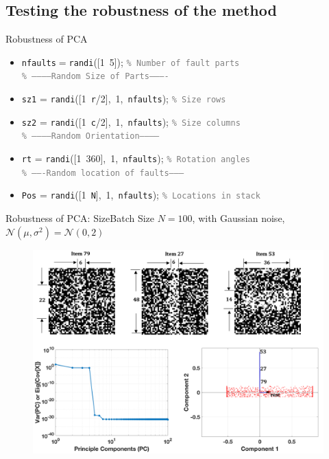 \documentclass{beamer}
\begin{document}
\subsection{Testing the robustness of the method}

\begin{frame}{Robustness of PCA}
  \begin{itemize}
    \item \texttt{nfaults}$ = $\texttt{randi}([1~5]); \texttt{\textcolor{gray}{\% Number of fault parts}} \\
    \texttt{\textcolor{gray}{\% -----------Random Size of Parts----------}}
    \item \texttt{sz1} = \texttt{randi}([1~\texttt{r}/2],~1,~\texttt{nfaults}); \texttt{\textcolor{gray}{\% Size rows}}
    \item \texttt{sz2} = \texttt{randi}([1~\texttt{c}/2],~1,~\texttt{nfaults}); \texttt{\textcolor{gray}{\% Size columns}}\\
    \texttt{\textcolor{gray}{\% -----------Random Orientation------------}}
    \item \texttt{rt} = \texttt{randi}([1~360],~1,~\texttt{nfaults}); \texttt{\textcolor{gray}{\% Rotation angles}} \\
    \texttt{\textcolor{gray}{\% -------Random location of faults---------}}
    \item \texttt{Pos} = \texttt{randi}([1~\texttt{N}],~1,~\texttt{nfaults}); \texttt{\textcolor{gray}{\% Locations in stack}}
  \end{itemize}
\end{frame}

\begin{frame}{Robustness of PCA: Size}{Batch Size $N = 100$, with Gaussian noise, $\mathcal{N}(\mu,\sigma^2)=\mathcal{N}(0,2)$}
  \begin{figure}
    \includegraphics[width=1\textheight]{Random_Size_Detection}
  \end{figure}
\end{frame}
\end{document}
